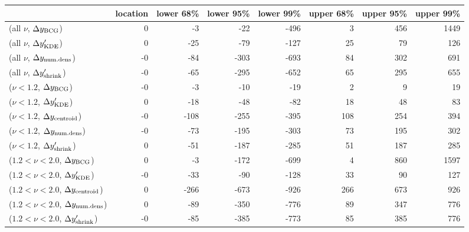 \begin{tabular}{lrrrrrrr}
\toprule
{} &  location &  lower 68\% &  lower 95\% &  lower 99\% &  upper 68\% &  upper 95\% &  upper 99\% \\
\midrule
(all $\nu$, $\Delta y_{\rm BCG}$)               &         0 &          -3 &         -22 &        -496 &           3 &         456 &        1449 \\
(all $\nu$, $\Delta y_{\rm KDE}'$)              &         0 &         -25 &         -79 &        -127 &          25 &          79 &         126 \\
(all $\nu$, $\Delta y_{\rm num. dens}$)         &        -0 &         -84 &        -303 &        -693 &          84 &         302 &         691 \\
(all $\nu$, $\Delta y_{\rm shrink}'$)           &        -0 &         -65 &        -295 &        -652 &          65 &         295 &         655 \\
($\nu < 1.2$, $\Delta y_{\rm BCG}$)             &        -0 &          -3 &         -10 &         -19 &           2 &           9 &          19 \\
($\nu < 1.2$, $\Delta y_{\rm KDE}'$)            &         0 &         -18 &         -48 &         -82 &          18 &          48 &          83 \\
($\nu < 1.2$, $\Delta y_{\rm centroid}$)        &        -0 &        -108 &        -255 &        -395 &         108 &         254 &         394 \\
($\nu < 1.2$, $\Delta y_{\rm num. dens}$)       &        -0 &         -73 &        -195 &        -303 &          73 &         195 &         302 \\
($\nu < 1.2$, $\Delta y_{\rm shrink}'$)         &         0 &         -51 &        -187 &        -285 &          51 &         187 &         285 \\
($1.2 < \nu < 2.0$, $\Delta y_{\rm BCG}$)       &         0 &          -3 &        -172 &        -699 &           4 &         860 &        1597 \\
($1.2 < \nu < 2.0$, $\Delta y_{\rm KDE}'$)      &        -0 &         -33 &         -90 &        -128 &          33 &          90 &         127 \\
($1.2 < \nu < 2.0$, $\Delta y_{\rm centroid}$)  &         0 &        -266 &        -673 &        -926 &         266 &         673 &         926 \\
($1.2 < \nu < 2.0$, $\Delta y_{\rm num. dens}$) &         0 &         -89 &        -350 &        -776 &          89 &         347 &         776 \\
($1.2 < \nu < 2.0$, $\Delta y_{\rm shrink}'$)   &        -0 &         -85 &        -385 &        -773 &          85 &         385 &         776 \\
\bottomrule
\end{tabular}
